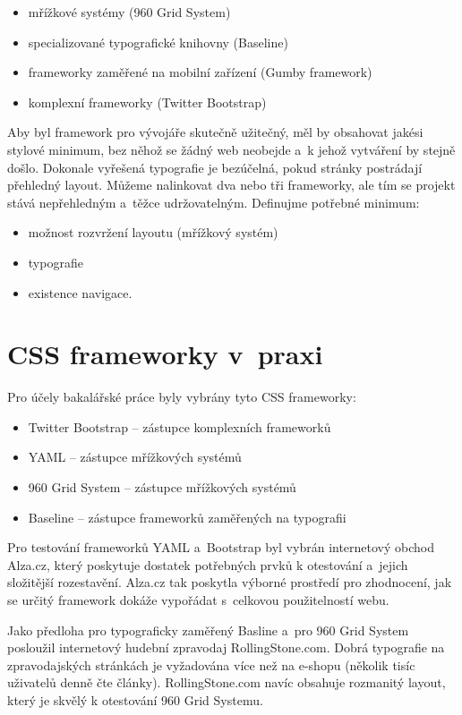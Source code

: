 \documentclass[thesis=B,czech]{FITthesis}[2012/06/26]
\begin{document}
\begin{itemize}
 \item mřížkové systémy (960 Grid System)
 \item specializované typografické knihovny (Baseline)
 \item frameworky zaměřené na mobilní zařízení (Gumby framework)
 \item komplexní frameworky (Twitter Bootstrap)
\end{itemize}
Aby byl framework pro vývojáře skutečně užitečný, měl by obsahovat jakési stylové minimum, bez něhož se žádný web neobejde a~k jehož vytváření by stejně došlo. Dokonale vyřešená typografie je bezúčelná, pokud stránky postrádají přehledný layout. Můžeme nalinkovat dva nebo tři frameworky, ale tím se projekt stává nepřehledným a~těžce udržovatelným. Definujme potřebné minimum:

\begin{itemize}
 \item možnost rozvržení layoutu (mřížkový systém)
 \item typografie
 \item existence navigace.
\end{itemize}

\section{CSS frameworky v~praxi}


Pro účely bakalářské práce byly vybrány tyto CSS frameworky:

\begin{itemize}
 \item Twitter Bootstrap -- zástupce komplexních frameworků
 \item YAML -- zástupce mřížkových systémů
 \item 960 Grid System -- zástupce mřížkových systémů
 \item Baseline -- zástupce frameworků zaměřených na typografii
\end{itemize}
Pro testování frameworků YAML a~Bootstrap byl vybrán internetový obchod Alza.cz, který poskytuje dostatek potřebných prvků k otestování a~jejich složitější rozestavění. Alza.cz tak poskytla výborné prostředí pro zhodnocení, jak se určitý framework dokáže vypořádat s~celkovou použitelností webu.

Jako předloha pro typograficky zaměřený Basline a~pro 960 Grid System posloužil internetový hudební zpravodaj RollingStone.com. Dobrá typografie na zpravodajských stránkách je vyžadována více než na e-shopu (několik tisíc uživatelů denně čte články). RollingStone.com  navíc obsahuje rozmanitý layout, který je skvělý k otestování 960 Grid Systemu. 
\end{document}
